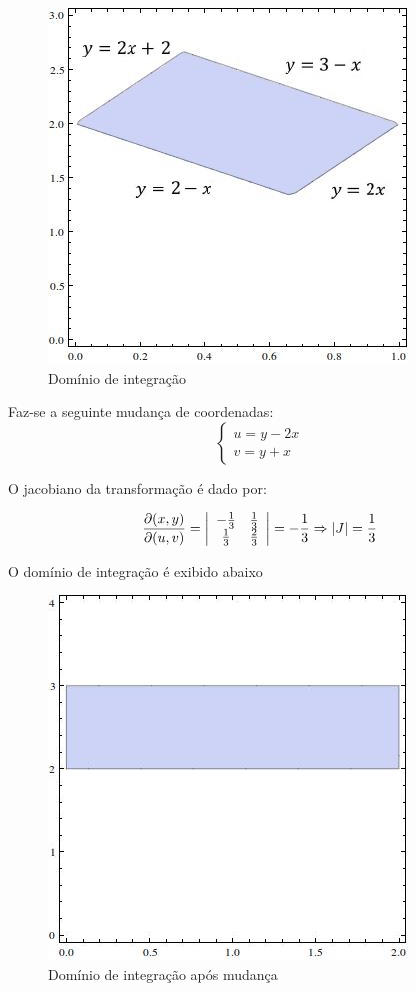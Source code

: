\documentclass[12pt,a4paper]{article}
\begin{document}
\begin{itemize}
\begin{figure}[h!]
	\centering
	\includegraphics[scale=0.5]{Q1bB.jpg}  
	\caption{Domínio de integração}
	\label{fig:figura8}
\end{figure}
    
Faz-se a seguinte mudança de coordenadas:
    $$\left\{
	\begin{array}{lr}
	u = y-2x\\
	v = y+x
	\end{array}
	\right. 
	$$
    
O jacobiano da transformação é dado por:

$$
\frac{\partial(x,y)}{\partial(u,v)}=
\left|
\begin{array}{cc}
-\frac{1}{3} & \frac{1}{3} \\
\frac{1}{3} & \frac{2}{3}\\
\end{array}
\right|
=-\frac{1}{3} \Rightarrow |J|=\frac{1}{3}\\
$$    

O domínio de integração é exibido abaixo

\begin{figure}[h!]
	\centering
	\includegraphics[scale=0.5]{Q1b2B.jpg}  
	\caption{Domínio de integração após mudança}
	\label{fig:figura9}
\end{figure}


\end{itemize}
\end{document}
